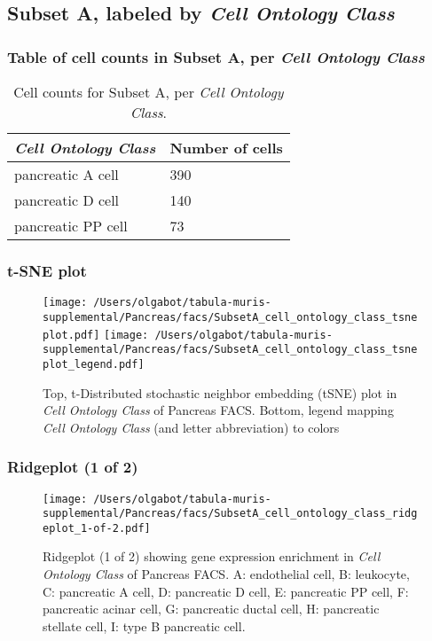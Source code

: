 \clearpage

\subsection{Subset A, labeled by \emph{Cell Ontology Class}}
\subsubsection{Table of cell counts in Subset A, per \emph{Cell Ontology Class}}\begin{table}[h]
\centering
\label{my-label}
\begin{tabular}{@{}ll@{}}
\toprule

\emph{Cell Ontology Class}& Number of cells \\ \midrule
pancreatic A cell & 390 \\

pancreatic D cell & 140 \\

pancreatic PP cell & 73 \\
\bottomrule
\end{tabular}
\caption{Cell counts for Subset A, per \emph{Cell Ontology Class}.}
\end{table}

\clearpage
\subsubsection{t-SNE plot}
\begin{figure}[h]
\centering
\texttt{[image: /Users/olgabot/tabula-muris-supplemental/Pancreas/facs/SubsetA\_cell\_ontology\_class\_tsneplot.pdf]}
\texttt{[image: /Users/olgabot/tabula-muris-supplemental/Pancreas/facs/SubsetA\_cell\_ontology\_class\_tsneplot\_legend.pdf]}
\caption{Top, t-Distributed stochastic neighbor embedding (tSNE) plot  in \emph{Cell Ontology Class} of Pancreas FACS. Bottom, legend mapping \emph{Cell Ontology Class} (and letter abbreviation) to colors}
\end{figure}


\clearpage

\subsubsection{Ridgeplot (1 of 2)}
\begin{figure}[h]
\centering
\texttt{[image: /Users/olgabot/tabula-muris-supplemental/Pancreas/facs/SubsetA\_cell\_ontology\_class\_ridgeplot\_1-of-2.pdf]}

\caption{ Ridgeplot (1 of 2)  showing gene expression enrichment in \emph{Cell Ontology Class} of Pancreas FACS. A: endothelial cell, B: leukocyte, C: pancreatic A cell, D: pancreatic D cell, E: pancreatic PP cell, F: pancreatic acinar cell, G: pancreatic ductal cell, H: pancreatic stellate cell, I: type B pancreatic cell.}
\end{figure}


